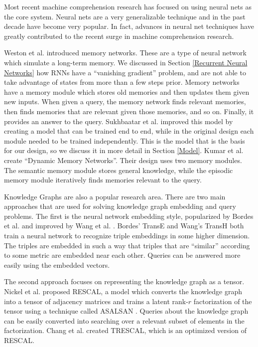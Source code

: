 \documentclass[pageno]{final_paper}
\begin{document}
Most recent machine comprehension research has focused on using neural nets as
the core system. Neural nets are a very generalizable technique and in the past
decade have become very popular. In fact, advances in neural net techniques have
greatly contributed to the recent surge in machine comprehension research.

Weston et al. \cite{Weston2015a} introduced memory networks. These are a type of
neural network which simulate a long-term memory. We discussed in Section
\ref{Recurrent Neural Networks} how RNNs have a ``vanishing gradient'' problem,
and are not able to take advantage of states from more than a few steps prior.
Memory networks have a memory module which stores old memories and then updates
them given new inputs. When given a query, the memory network finds relevant
memories, then finds memories that are relevant given those memories, and so on.
Finally, it provides an answer to the query. Sukhbaatar et al.
\cite{Sukhbaatar2015} improved this model by creating a model that can be
trained end to end, while in the original design each module needed to be
trained independently. This is the model that is the basis for our design, so we
discuss it in more detail in Section \ref{Model}. Kumar et al. \cite{Kumar2015}
create ``Dynamic Memory Networks''. Their design uses two memory modules. The
semantic memory module stores general knowledge, while the episodic memory
module iteratively finds memories relevant to the query.

Knowledge Graphs are also a popular research area. There are two main approaches
that are used for solving knowledge graph embedding and query problems. The
first is the neural network embedding style, popularized by Bordes et al.
\cite{Bordes2013} and improved by Wang et al. \cite{Wang2014}. Bordes' TransE
and Wang's TransH both train a neural network to recognize triple embeddings in
some higher dimension. The triples are embedded in such a way that triples that
are ``similar'' according to some metric are embedded near each other. Queries
can be answered more easily using the embedded vectors.

The second approach focuses on representing the knowledge graph as a tensor.
Nickel et al. \cite{Nickel2011} proposed RESCAL, a model which converts the
knowledge graph into a tensor of adjacency matrices and trains a latent rank-$r$
factorization of the tensor using a technique called ASALSAN \cite{Bader2007}.
Queries about the knowledge graph can be easily converted into searching over a
relevant subset of elements in the factorization. Chang et al. \cite{Chang2014}
created TRESCAL, which is an optimized version of RESCAL.
\end{document}
